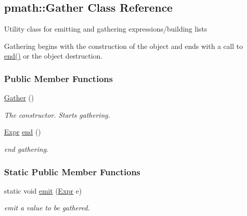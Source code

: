 \hypertarget{classpmath_1_1_gather}{
\subsection{pmath::Gather Class Reference}
\label{classpmath_1_1_gather}
}
Utility class for emitting and gathering expressions/building lists

Gathering begins with the construction of the object and ends with a call to \hyperlink{classpmath_1_1_gather_d686bb5cc8ffc544bff3f7aaa3723061}{end()} or the object destruction.  


\subsubsection*{Public Member Functions}
\begin{CompactItemize}
\item 
\hypertarget{classpmath_1_1_gather_500b90b7db7cf1efd445d450cb184724}{
\hyperlink{classpmath_1_1_gather_500b90b7db7cf1efd445d450cb184724}{Gather} ()}
\label{classpmath_1_1_gather_500b90b7db7cf1efd445d450cb184724}

\begin{CompactList}\small\item\em The constructor. Starts gathering. \item\end{CompactList}\item 
\hypertarget{classpmath_1_1_gather_d686bb5cc8ffc544bff3f7aaa3723061}{
\hyperlink{classpmath_1_1_expr}{Expr} \hyperlink{classpmath_1_1_gather_d686bb5cc8ffc544bff3f7aaa3723061}{end} ()}
\label{classpmath_1_1_gather_d686bb5cc8ffc544bff3f7aaa3723061}

\begin{CompactList}\small\item\em end gathering. \item\end{CompactList}\end{CompactItemize}
\subsubsection*{Static Public Member Functions}
\begin{CompactItemize}
\item 
\hypertarget{classpmath_1_1_gather_18b782b18cbf0e217519266892d2338e}{
static void \hyperlink{classpmath_1_1_gather_18b782b18cbf0e217519266892d2338e}{emit} (\hyperlink{classpmath_1_1_expr}{Expr} e)}
\label{classpmath_1_1_gather_18b782b18cbf0e217519266892d2338e}

\begin{CompactList}\small\item\em emit a value to be gathered. \item\end{CompactList}\end{CompactItemize}


